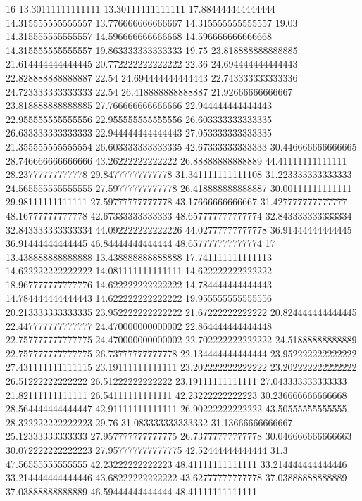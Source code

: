 16 13.30111111111111 13.30111111111111 17.884444444444444 14.315555555555557 13.776666666666667 14.315555555555557 19.03 14.315555555555557 14.596666666666668 14.596666666666668 14.315555555555557 19.863333333333333 19.75 23.818888888888885 21.614444444444445 20.772222222222222 22.36 24.694444444444443 22.828888888888887 22.54 24.694444444444443 22.743333333333336 24.723333333333333 22.54 26.418888888888887 21.92666666666667 23.818888888888885 27.766666666666666 22.944444444444443 22.955555555555556 22.955555555555556 26.603333333333335 26.633333333333333 22.944444444444443 27.053333333333335 21.355555555555554 26.603333333333335 42.67333333333333 30.446666666666665 28.746666666666666 43.26222222222222 26.88888888888889 44.41111111111111 28.23777777777778 29.84777777777778 31.341111111111108 31.223333333333333 24.565555555555555 27.59777777777778 26.418888888888887 30.00111111111111 29.98111111111111 27.59777777777778 43.17666666666667 31.427777777777777 48.16777777777778 42.67333333333333 48.657777777777774 32.843333333333334 32.843333333333334 44.092222222222226 44.02777777777778 36.91444444444445 36.91444444444445 46.84444444444444 48.657777777777774
17 13.438888888888888 13.438888888888888 17.741111111111113 14.622222222222222 14.081111111111111 14.622222222222222 18.967777777777776 14.622222222222222 14.784444444444443 14.784444444444443 14.622222222222222 19.955555555555556 20.213333333333335 23.952222222222222 21.67222222222222 20.824444444444445 22.447777777777777 24.470000000000002 22.864444444444448 22.757777777777775 24.470000000000002 22.702222222222222 24.51888888888889 22.757777777777775 26.73777777777778 22.134444444444444 23.952222222222222 27.431111111111115 23.19111111111111 23.202222222222222 23.202222222222222 26.51222222222222 26.51222222222222 23.19111111111111 27.043333333333333 21.82111111111111 26.54111111111111 42.23222222222223 30.236666666666668 28.564444444444447 42.91111111111111 26.90222222222222 43.50555555555555 28.322222222222223 29.76 31.083333333333332 31.13666666666667 25.12333333333333 27.957777777777775 26.73777777777778 30.046666666666663 30.072222222222223 27.957777777777775 42.52444444444444 31.3 47.56555555555555 42.23222222222223 48.41111111111111 33.214444444444446 33.214444444444446 43.68222222222222 43.62777777777778 37.03888888888889 37.03888888888889 46.59444444444444 48.41111111111111
